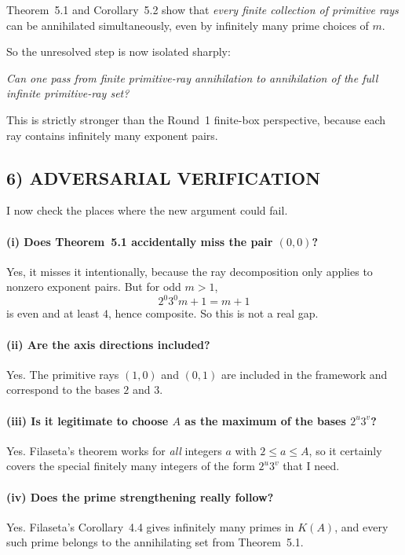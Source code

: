 Theorem~5.1 and Corollary~5.2 show that \emph{every finite collection of primitive rays} can be annihilated simultaneously, even by infinitely many prime choices of $m$.

So the unresolved step is now isolated sharply:

\medskip

\emph{Can one pass from finite primitive-ray annihilation to annihilation of the full infinite primitive-ray set?}

\medskip

This is strictly stronger than the Round~1 finite-box perspective, because each ray contains infinitely many exponent pairs.

\subsection*{6) ADVERSARIAL VERIFICATION}

I now check the places where the new argument could fail.

\paragraph{(i) Does Theorem~5.1 accidentally miss the pair $(0,0)$?}
Yes, it misses it intentionally, because the ray decomposition only applies to nonzero exponent pairs. But for odd $m>1$,
\[
2^0 3^0 m +1 = m+1
\]
is even and at least $4$, hence composite. So this is not a real gap.

\paragraph{(ii) Are the axis directions included?}
Yes. The primitive rays $(1,0)$ and $(0,1)$ are included in the framework and correspond to the bases $2$ and $3$.

\paragraph{(iii) Is it legitimate to choose $A$ as the maximum of the bases $2^u3^v$?}
Yes. Filaseta's theorem works for \emph{all} integers $a$ with $2\le a\le A$, so it certainly covers the special finitely many integers of the form $2^u3^v$ that I need.

\paragraph{(iv) Does the prime strengthening really follow?}
Yes. Filaseta's Corollary~4.4 gives infinitely many primes in $K(A)$, and every such prime belongs to the annihilating set from Theorem~5.1.

